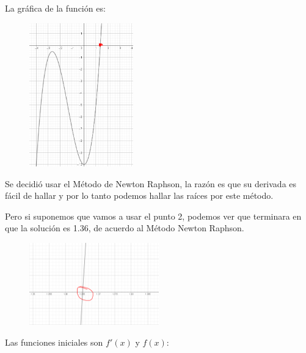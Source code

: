 \documentclass[a4paper,12pt]{article}
\newcommand{\eq}[1]{$#1$}
\begin{document}
    La gráfica de la función es:
    \begin{figure}[h]
        \centering
        \includegraphics[width=0.4\textwidth]{f7.PNG}
    \end{figure}

    Se decidió usar 
    el Método de Newton Raphson, la razón es que su derivada es fácil 
    de hallar y por lo tanto
    podemos hallar las raíces por este método.

    Pero si suponemos que vamos a usar el punto 2, podemos ver que terminara en 
    que la solución es 1.36, de acuerdo al Método Newton Raphson.

    \begin{figure}[h]
        \centering
        \includegraphics[width=0.5\textwidth]{f7_2.PNG}
    \end{figure}
\newpage

Las funciones iniciales son \eq{f'(x)} y \eq{f(x)}:
\end{document}
